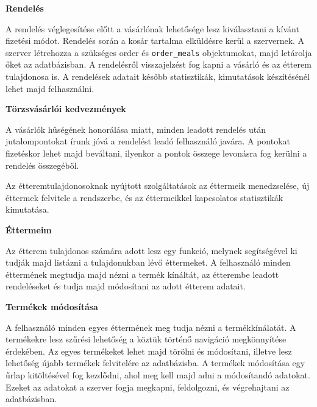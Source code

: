 \bigskip

\noindent \textbf{Rendelés}

\bigskip

A rendelés véglegesítése előtt a vásárlónak lehetősége lesz kiválasztani a kívánt fizetési módot. Rendelés során a kosár tartalma elküldésre kerül a szervernek. A szerver létrehozza a szükséges order és \texttt{order\_meals} objektumokat, majd letárolja őket az adatbázisban. A rendelésről visszajelzést fog kapni a vásárló és az étterem tulajdonosa is. A rendelések adatait később statisztikák, kimutatások készítésénél lehet majd felhasználni.

\bigskip

\noindent \textbf{Törzsvásárlói kedvezmények}

\bigskip

A vásárlók hűségének honorálása miatt, minden leadott rendelés után jutalompontokat írunk jóvá a rendelést leadó felhasználó javára. A pontokat fizetéskor lehet majd beváltani, ilyenkor a pontok összege levonásra fog kerülni a rendelés összegéből.


Az étteremtulajdonosoknak nyújtott szolgáltatások az éttermeik menedzselése, új éttermek felvitele a rendszerbe, és az éttermeikkel kapcsolatos statisztikák kimutatása.

\bigskip

\noindent \textbf{Éttermeim}

\bigskip

Az étterem tulajdonos számára adott lesz egy funkció, melynek segítségével ki tudják majd listázni a tulajdonukban lévő éttermeket. A felhasználó minden éttermének megtudja majd nézni a termék kínáltát, az étterembe leadott rendeléseket és tudja majd módosítani az adott étterem adatait.

\newpage

\noindent \textbf{Termékek módosítása}

\bigskip

A felhasználó minden egyes éttermének meg tudja nézni a termékkínálatát. A termékekre lesz szűrési lehetőség a köztük történő navigáció megkönnyítése érdekében. Az egyes termékeket lehet majd törölni és módosítani, illetve lesz lehetőség újabb termékek felvitelére az adatbázisba.
A termékek módosítása egy űrlap kitöltésével fog kezdődni, ahol meg kell majd adni a módosítandó adatokat. Ezeket az adatokat a szerver fogja megkapni, feldolgozni, és végrehajtani az adatbázisban.

